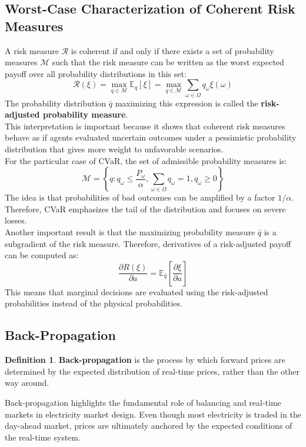 \documentclass[12pt, openany]{report}
\theoremstyle{definition}
\newtheorem{definition}[thm]{Definition}
\begin{document}
\subsection{Worst-Case Characterization of Coherent Risk Measures}
A risk measure $\mathcal{R}$ is coherent if and only if there exists a set of probability measures $\mathcal{M}$ such that the risk measure can be written as the worst expected payoff over all probability distributions in this set:
\begin{equation}
    \mathcal{R}(\xi)=\max_{q\in\mathcal{M}} \mathbb{E}_q[\xi] = \max_{q\in\mathcal{M}} \sum_{\omega\in\Omega} q_\omega \xi(\omega)
\end{equation}
The probability distribution \(\bar q\) maximizing this expression is called
the \textbf{risk-adjusted probability measure}.\\
This interpretation is important because it shows that coherent risk measures behave as if agents evaluated uncertain outcomes under a pessimistic probability distribution that gives more weight to unfavorable scenarios.\\
For the particular case of CVaR, the set of admissible probability measures is:
\begin{equation}
    \mathcal{M} = \left\{ q : q_\omega \le \frac{P_\omega}{\alpha}, \sum_{\omega\in\Omega} q_\omega = 1, q_\omega \ge 0 \right\}
\end{equation}
The idea is that probabilities of bad outcomes can be amplified by a factor $1/\alpha$. Therefore, CVaR emphasizes the tail of the distribution and focuses on severe losses.\\
Another important result is that the maximizing probability measure $\bar q$ is a subgradient of the risk measure. Therefore, derivatives of a risk-adjusted payoff can be computed as:
\begin{equation}
    \frac{\partial R(\xi)}{\partial a} = \mathbb{E}_{\bar q} \left[ \frac{\partial \xi}{\partial a} \right]
\end{equation}
This means that marginal decisions are evaluated using the risk-adjusted
probabilities instead of the physical probabilities. 
\subsection{Back-Propagation}
\begin{definition}
    \textbf{Back-propagation} is the process by which forward prices are determined by the expected distribution of real-time prices, rather than the other way around.
\end{definition}
Back-propagation highlights the fundamental role of balancing and real-time markets in electricity market design. Even though most electricity is traded in the day-ahead market, prices are ultimately anchored by the expected conditions of the real-time system.
\end{document}
